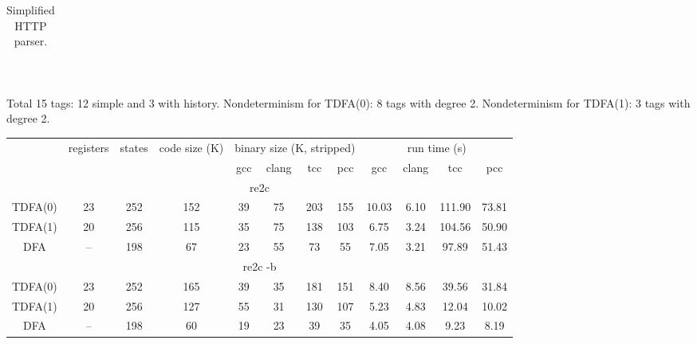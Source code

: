\documentclass{article}
\theoremstyle{definition}
\begin{document}
\begin{multicols}{2}
\begin{table}
\begin{center}
\begin{tabular}{|c|ccccccccccc|}
    \hline
    \end{tabular}\\
    \caption{Simplified HTTP parser.}
    \smallskip
    \footnotesize{Total 15 tags: 12 simple and 3 with history.
    Nondeterminism for TDFA(0): 8 tags with degree 2.
    Nondeterminism for TDFA(1): 3 tags with degree 2.}
\end{center}
\end{table}



\begin{table}\label{table3}
\begin{center}
    \begin{tabular}{|c|ccccccccccc|}
    \hline
    & registers & states & code size (K) & \multicolumn{4}{c}{binary size (K, stripped)} & \multicolumn{4}{c|}{run time (s)} \\
    & & &
        & gcc & clang & tcc & pcc
        & gcc & clang & tcc & pcc \\
    \hline \hline
    \multicolumn{12}{|c|}{re2c} \\
    \hline
    TDFA(0) & 23 & 252 & 152 & 39 & 75 & 203 & 155 & 10.03 & 6.10 & 111.90 & 73.81 \\
    TDFA(1) & 20 & 256 & 115 & 35 & 75 & 138 & 103 &  6.75 & 3.24 & 104.56 & 50.90 \\
    DFA     & -- & 198 &  67 & 23 & 55 &  73 &  55 &  7.05 & 3.21 &  97.89 & 51.43 \\
    \hline \hline
    \multicolumn{12}{|c|}{re2c -b} \\
    \hline
    TDFA(0) & 23 & 252 & 165 & 39 & 35 & 181 & 151 & 8.40 & 8.56 & 39.56 & 31.84 \\
    TDFA(1) & 20 & 256 & 127 & 55 & 31 & 130 & 107 & 5.23 & 4.83 & 12.04 & 10.02 \\
    DFA     & -- & 198 &  60 & 19 & 23 &  39 &  35 & 4.05 & 4.08 &  9.23 &  8.19 \\

\end{tabular}
\end{center}
\end{table}
\end{multicols}
\end{document}
